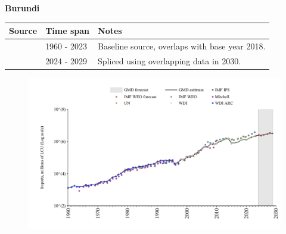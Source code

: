 \documentclass[12pt,a4paper,landscape]{article}
\begin{document}
\begin{adjustbox}{max totalsize={\paperwidth}{\paperheight},center}
\begin{minipage}[t][\textheight][t]{\textwidth}
\vspace*{0.5cm}
{}
\begin{center}
{\Large\bfseries Burundi}
\end{center}
\vspace{0.5cm}
\begin{table}[H]
\centering
\small
\begin{tabular}{|l|l|l|}
\hline
\textbf{Source} & \textbf{Time span} & \textbf{Notes} \\
\hline
\rowcolor{white}\cite{WDI}& 1960 - 2023 &Baseline source, overlaps with base year 2018.\\
\rowcolor{lightgray}\cite{IMF_WEO_forecast}& 2024 - 2029 &Spliced using overlapping data in 2030.\\
\hline
\end{tabular}
\end{table}
\begin{figure}[H]
\centering
\includegraphics[width=\textwidth,height=0.6\textheight,keepaspectratio]{graphs/BDI_imports.pdf}
\end{figure}
\end{minipage}
\end{adjustbox}
\end{document}
